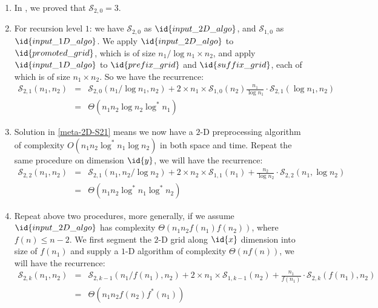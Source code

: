 \begin{IEEEproof}
\begin{enumerate}
\item In , we proved that $\mathcal{S}_{2, 0} = 3$.
\item For recursion level $1$: we have $\mathcal{S}_{2, 0}$ as 
  $\id{input\_2D\_algo}$, and $\mathcal{S}_{1, 0}$ as $\id{input\_1D\_algo}$.
  We apply $\id{input\_2D\_algo}$ to $\id{promoted\_grid}$, which is
  of size $n_1/\log n_1 \times n_2$, and apply $\id{input\_1D\_algo}$
  to $\id{prefix\_grid}$ and $\id{suffix\_grid}$, each of which is of
  size $n_1 \times n_2$. So we have the recurrence:
    \begin{eqnarray}
      \mathcal{S}_{2, 1}(n_1, n_2) & = & \mathcal{S}_{2, 0} (n_1/\log n_1,
      n_2) + 2 \times n_1 \times \mathcal{S}_{1, 0} (n_2) 
      \frac{n_1}{\log n_1} \cdot \mathcal{S}_{2, 1}(\log n_1, n_2) \\
          & = & \Theta(n_1 n_2 \log n_2 \log^* n_1)
    \label{eq:meta-2D-S21} 
    \end{eqnarray} 
\item Solution in \eqref{meta-2D-S21} means we now have a $2$-D preprocessing
  algorithm of complexity $O(n_1 n_2 \log^* n_1 \log n_2)$ in both
  space and time. Repeat the same procedure on dimension $\id{y}$, we will 
  have the recurrence:
  \begin{eqnarray}
    \mathcal{S}_{2, 2}(n_1, n_2) & = & \mathcal{S}_{2, 1} (n_1, n_2/\log n_2) 
    + 2 \times n_2 \times \mathcal{S}_{1, 1} (n_1) 
    + \frac{n_2}{\log n_2} \cdot \mathcal{S}_{2, 2}(n_1, \log n_2) \\
        & = & \Theta(n_1 n_2 \log^* n_1 \log^* n_2) 
  \label{eq:meta-2D-S22}
  \end{eqnarray}
\item Repeat above two procedures, more generally, if we assume 
  $\id{input\_2D\_algo}$ has complexity $\Theta(n_1 n_2 f(n_1) f(n_2))$,
  where $f(n) \leq n-2$. We first segment the $2$-D grid along $\id{x}$
  dimension into size of $f(n_1)$ and supply a $1$-D algorithm of
  complexity $\Theta(n f(n))$, we will have the recurrence:
  \begin{eqnarray}
    \mathcal{S}_{2, k}(n_1, n_2) & = & \mathcal{S}_{2, k-1} (n_1/f(n_1), n_2)
    + 2 \times n_1 \times \mathcal{S}_{1, k-1} (n_2)
    + \frac{n_1}{f(n_1)} \cdot \mathcal{S}_{2, k}(f(n_1), n_2) \\
        & = & \Theta(n_1 n_2 f(n_2) f^*(n_1))
  \label{eq:meta-2D-S2k}
  \end{eqnarray}


\end{enumerate}
\end{IEEEproof}
